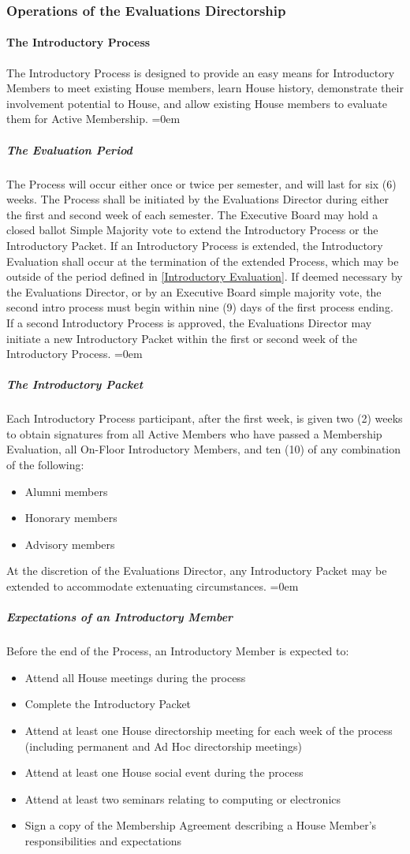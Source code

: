 \documentclass{article}
\newcommand{\asubsection}[1]{\subsubsection{#1} \label{#1}}
\newcommand{\asubsubsection}[1]{\paragraph{#1} \label{#1}}
\newcommand{\asubsubsubsection}[1]{\parindent=0em\subparagraph{#1} \label{#1}}
\begin{document}
\asubsection{Operations of the Evaluations Directorship}
\asubsubsection{The Introductory Process}
The Introductory Process is designed to provide an easy means for Introductory Members to meet existing House members, learn House history, demonstrate their involvement potential to House, and allow existing House members to evaluate them for Active Membership.
\asubsubsubsection{The Evaluation Period}
The Process will occur either once or twice per semester, and will last for six (6) weeks.
The Process shall be initiated by the Evaluations Director during either the first and second week of each semester.
The Executive Board may hold a closed ballot Simple Majority vote to extend the Introductory Process or the Introductory Packet.
If an Introductory Process is extended, the Introductory Evaluation shall occur at the termination of the extended Process, which may be outside of the period defined in \ref{Introductory Evaluation}.
If deemed necessary by the Evaluations Director, or by an Executive Board simple majority vote, the second intro process must begin within nine (9) days of the first process ending.
If a second Introductory Process is approved, the Evaluations Director may initiate a new Introductory Packet within the first or second week of the Introductory Process.
\asubsubsubsection{The Introductory Packet}
Each Introductory Process participant, after the first week, is given two (2) weeks to obtain signatures from all Active Members who have passed a Membership Evaluation, all On-Floor Introductory Members, and ten (10) of any combination of the following:
\begin{itemize}
	\item Alumni members
	\item Honorary members
	\item Advisory members
\end{itemize}
At the discretion of the Evaluations Director, any Introductory Packet may be extended to accommodate extenuating circumstances.
\asubsubsubsection{Expectations of an Introductory Member}
Before the end of the Process, an Introductory Member is expected to:
\begin{itemize}
\item Attend all House meetings during the process
\item Complete the Introductory Packet
\item Attend at least one House directorship meeting for each week of the process (including permanent and Ad Hoc directorship meetings)
\item Attend at least one House social event during the process
\item Attend at least two seminars relating to computing or electronics
\item Sign a copy of the Membership Agreement describing a House Member’s responsibilities and expectations
\end{itemize}
\end{document}
